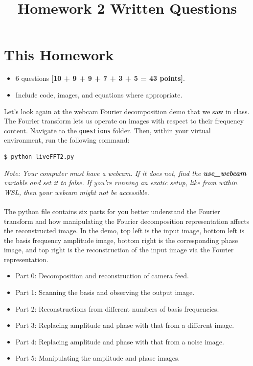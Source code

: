 \documentclass{csci1430}
\begin{document}
\title{Homework 2 Written Questions}
\maketitle
\thispagestyle{fancy}

\writeinstructions

\section*{This Homework}
\begin{itemize}
    \item 6 questions \textbf{[10 + 9 + 9 + 7 + 3 + 5 = 43 points]}.
    \item Include code, images, and equations where appropriate.
\end{itemize}

\pagebreak


\begin{question}[points=10] 
Let's look again at the webcam Fourier decomposition demo that we saw in class. The Fourier transform lets us operate on images with respect to their frequency content. Navigate to the \texttt{questions} folder. Then, within your virtual environment, run the following command:
\begin{verbatim}
$ python liveFFT2.py
\end{verbatim}
\end{question}

\emph{Note: Your computer must have a webcam. If it does not, find the \textbf{use\_webcam} variable and set it to false. If you're running an exotic setup, like from within WSL, then your webcam might not be accessible.}
\\
\\
The python file contains six parts for you better understand the Fourier transform and how manipulating the Fourier decomposition representation affects the reconstructed image. In the demo, top left is the input image, bottom left is the basis frequency amplitude image, bottom right is the corresponding phase image, and top right is the reconstruction of the input image via the Fourier representation.

\begin{itemize}
    \item Part 0: Decomposition and reconstruction of camera feed.
    \item Part 1: Scanning the basis and observing the output image.
    \item Part 2: Reconstructions from different numbers of basis frequencies.
    \item Part 3: Replacing amplitude and phase with that from a different image.
    \item Part 4: Replacing amplitude and phase with that from a noise image.
    \item Part 5: Manipulating the amplitude and phase images.
\end{itemize}
\end{document}
